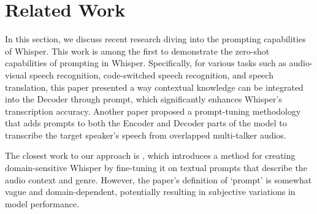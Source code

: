 \section{Related Work}
In this section, we discuss recent research diving into the prompting capabilities of Whisper. 
This work \cite{application3} is among the first to demonstrate the zero-shot capabilities of prompting in Whisper. Specifically, for various tasks such as audio-visual speech recognition, code-switched speech recognition, and speech translation, this paper presented a way contextual knowledge can be integrated into the Decoder through prompt, which significantly enhances Whisper's transcription accuracy. Another paper \cite{speakerprompt} proposed a prompt-tuning methodology that adds prompts to both the Encoder and Decoder parts of the model to transcribe the target speaker's speech from overlapped multi-talker audios.

The closest work to our approach is \cite{zeroshotdomain}, which introduces a method for creating domain-sensitive Whisper by fine-tuning it on textual prompts that describe the audio context and genre. However, the paper's definition of `prompt' is somewhat vague and domain-dependent, potentially resulting in subjective variations in model performance.

